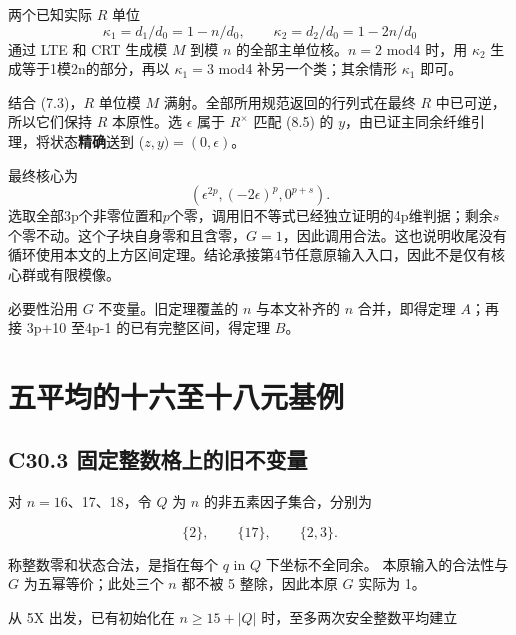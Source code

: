 \documentclass[11pt,a4paper]{article}
\theoremstyle{definition}
\numberwithin{equation}{section}
\begin{document}
{两个已知实际} {\ensuremath{R}} {单位} \[
\kappa_1=d_1/d_0=1-n/d_0,\qquad
\kappa_2=d_2/d_0=1-2n/d_0
\] {通过} {LTE} {和} {CRT} {生成模} {\ensuremath{M}} {到模} {\ensuremath{n}} {的全部主单位核。\ensuremath{n=2}} {mod4} {时，用} {\ensuremath{\kappa _{2}}} {生成等于1模2n的部分，再以} {\ensuremath{\kappa _{1}=3}} {mod4} {补另一个类；其余情形} {\ensuremath{\kappa _{1}}} {即可。}

{结合} {(7.3)，\ensuremath{R}} {单位模} {\ensuremath{M}} {满射。全部所用规范返回的行列式在最终} {\ensuremath{R}} {中已可逆，所以它们保持} {\ensuremath{R}} {本原性。选} {\ensuremath{\epsilon }} {属于} {\ensuremath{R^\times}} {匹配} {(8.5)} {的} {\ensuremath{y}，由已证主同余纤维引理，将状态}\textbf{{精确}}{送到} {(\ensuremath{z,y)=(0,\epsilon )}。}

{最终核心为} \[
(\epsilon^{2p},(-2\epsilon)^p,0^{p+s}).
\] {选取全部3p个非零位置和\ensuremath{p}个零，调用旧不等式已经独立证明的4p维判据；剩余\ensuremath{s}个零不动。这个子块自身零和且含零，\ensuremath{G=1}，因此调用合法。这也说明收尾没有循环使用本文的上方区间定理。结论承接第4节任意原输入入口，因此不是仅有核心群或有限模像。}

{必要性沿用} {\ensuremath{G}} {不变量。旧定理覆盖的} {\ensuremath{n}} {与本文补齐的} {\ensuremath{n}} {合并，即得定理} {\ensuremath{A}；再接} {3p+10} {至4p-1} {的已有完整区间，得定理} {\ensuremath{B}。}


\section{五平均的十六至十八元基例}\label{construct:five-small}
\subsection*{\texorpdfstring{{C30.3} {固定整数格上的旧不变量}}{C30.3 固定整数格上的旧不变量}}\label{C30-h193}

{对} {\ensuremath{n=16}、17、18，令} {\ensuremath{Q}} {为} {\ensuremath{n}} {的非五素因子集合，分别为}

\[
\{2\},\qquad\{17\},\qquad\{2,3\}.
\]

{称整数零和状态合法，是指在每个} {\ensuremath{q}} {in} {\ensuremath{Q}} {下坐标不全同余。} {本原输入的合法性与} {\ensuremath{G}} {为五幂等价；此处三个} {\ensuremath{n}} {都不被} {5} {整除，因此本原} {\ensuremath{G}} {实际为} {1。}

{从} {5X} {出发，已有初始化在} {\ensuremath{n\ge 15+|Q|}} {时，至多两次安全整数平均建立}
\end{document}
